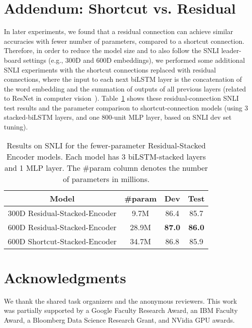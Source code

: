 \documentclass[11pt,letterpaper]{article}
\begin{document}
\section{Addendum: Shortcut vs. Residual}
In later experiments, we found that a residual connection can achieve similar accuracies with fewer number of parameters, compared to a shortcut connection. Therefore, in order to reduce the model size and to also follow the SNLI leader-board settings (e.g., 300D and 600D embeddings), we performed some additional SNLI experiments with the shortcut connections replaced with residual connections, where the input to each next biLSTM layer is the concatenation of the word embedding and the summation of outputs of all previous layers (related to ResNet in computer vision~\cite{he2016deep}).
Table~\ref{tab:test_snli_table} shows these residual-connection SNLI test results and the parameter comparison to shortcut-connection models (using 3 stacked-biLSTM layers, and one 800-unit MLP layer, based on SNLI dev set tuning).


\begin{table}[ht]
\begin{center}
\small
\begin{tabular}{|c|ccc|}
\hline
{\bf Model} & {\bf \#param} & {\bf Dev}  & {\bf Test} \\
\hline
300D Residual-Stacked-Encoder & 9.7M & 86.4 & 85.7\\
600D Residual-Stacked-Encoder & 28.9M & \textbf{87.0} & \textbf{86.0}\\
\hline
600D Shortcut-Stacked-Encoder & 34.7M & 86.8 & 85.9\\
\hline
\end{tabular}
\end{center}
\caption{Results on SNLI for the fewer-parameter Residual-Stacked Encoder models. Each model has 3 biLSTM-stacked layers and 1 MLP layer. The \#param column denotes the number of parameters in millions.}\label{tab:test_snli_table}
\end{table}


\section*{Acknowledgments}
We thank the shared task organizers and the anonymous reviewers. This work was partially supported by a Google
Faculty Research Award, an IBM Faculty Award,
a Bloomberg Data Science Research Grant, and
NVidia GPU awards.





\end{document}
